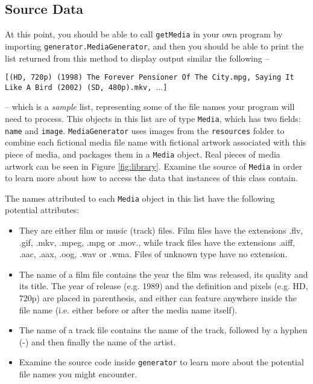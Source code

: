 \documentclass[11pt]{article}
\begin{document}
\subsection{Source Data}

At this point, you should be able to call \texttt{getMedia} in your own program by importing \texttt{generator.MediaGenerator}, and then you should be able to print the list returned from this method to display output similar the following --

\texttt{[(HD, 720p) (1998) The Forever Pensioner Of The City.mpg, Saying It Like A Bird (2002) (SD, 480p).mkv, $\dots$]}

-- which is a \emph{sample} list, representing some of the file names your program will need to process. This objects in this list are of type \texttt{Media}, which has two fields: \texttt{name} and \texttt{image}. \texttt{MediaGenerator} uses images from the \texttt{resources} folder to combine each fictional media file name with fictional artwork associated with this piece of media, and packages them in a \texttt{Media} object. Real pieces of media artwork can be seen in Figure \ref{fig:library}. Examine the source of \texttt{Media} in order to learn more about how to access the data that instances of this class contain.

The names attributed to each \texttt{Media} object in this list have the following potential attributes:

\begin{itemize}

	\item They are either film or music (track) files. Film files have the extensions .flv, .gif, .mkv, .mpeg, .mpg or .mov., while track files have the extensions .aiff, .aac, .aax, .oog, .wav or .wma. Files of unknown type have no extension.
	
	\item The name of a film file contains the year the film was released, its quality and its title. The year of release (e.g. 1989) and the definition and pixels (e.g. HD, 720p) are placed in parenthesis, and either can feature anywhere inside the file name (i.e. either before or after the media name itself).
	
	\item The name of a track file contains the name of the track, followed by a hyphen (-) and then finally the name of the artist.
	
	\item Examine the source code inside \texttt{generator} to learn more about the potential file names you might encounter.

\end{itemize}
\end{document}
